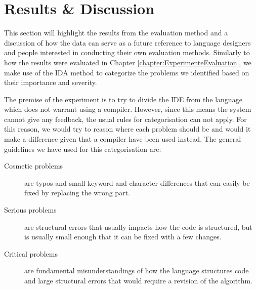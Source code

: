 \chapter{Results \& Discussion}

This section will highlight the results from the evaluation method and a discussion of how the data can serve as a future reference to language designers and people interested in conducting their own evaluation methods. Similarly to how the results were evaluated in Chapter \ref{chapter:ExperimenteEvaluation}, we make use of the IDA method \cite{IDA} to categorize the problems we identified based on their importance and severity.

The premise of the experiment is to try to divide the IDE from the language which does not warrant using a compiler.
However, since this means the system cannot give any feedback, the usual rules for categorisation can not apply.
For this reason, we would try to reason where each problem should be and would it make a difference given that a compiler have been used instead.
The general guidelines we have used for this categorisation are:
\begin{description}
\item[Cosmetic problems] are typos and small keyword and character differences that can easily be fixed by replacing the wrong part.
\item[Serious problems] are structural errors that usually impacts how the code is structured, but is usually small enough that it can be fixed with a few changes.
\item[Critical problems] are fundamental misunderstandings of how the language structures code and large structural errors that would require a revision of the algorithm.
\end{description}

